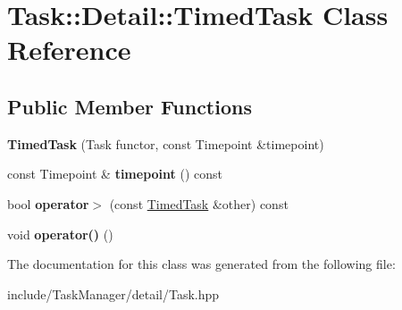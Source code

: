 \hypertarget{classTask_1_1Detail_1_1TimedTask}{}\section{Task\+:\+:Detail\+:\+:Timed\+Task Class Reference}
\label{classTask_1_1Detail_1_1TimedTask}
\subsection*{Public Member Functions}
\begin{DoxyCompactItemize}
\item 
\mbox{\label{classTask_1_1Detail_1_1TimedTask_a08d21b8047bf71739948ac70ba6013a9}} 
{\bfseries Timed\+Task} (Task functor, const Timepoint \&timepoint)
\item 
\mbox{\label{classTask_1_1Detail_1_1TimedTask_aa978842dfcd5984db8133cf5d54a9f56}} 
const Timepoint \& {\bfseries timepoint} () const
\item 
\mbox{\label{classTask_1_1Detail_1_1TimedTask_a2a256f1f655755dc45e4693114dfe82b}} 
bool {\bfseries operator$>$} (const \hyperlink{classTask_1_1Detail_1_1TimedTask}{Timed\+Task} \&other) const
\item 
\mbox{\label{classTask_1_1Detail_1_1TimedTask_a6915f45e065ac53ea328b8bff29dc3ba}} 
void {\bfseries operator()} ()
\end{DoxyCompactItemize}


The documentation for this class was generated from the following file\+:\begin{DoxyCompactItemize}
\item 
include/\+Task\+Manager/detail/Task.\+hpp\end{DoxyCompactItemize}
